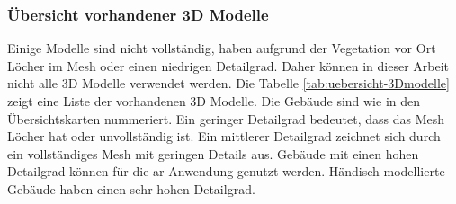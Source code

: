 \subsubsection{Übersicht vorhandener 3D Modelle}
Einige Modelle sind nicht vollständig, haben aufgrund der Vegetation vor Ort Löcher im Mesh oder einen niedrigen Detailgrad. Daher können in dieser Arbeit nicht alle 3D Modelle verwendet werden. Die Tabelle \ref{tab:uebersicht-3Dmodelle} zeigt eine Liste der vorhandenen 3D Modelle. Die Gebäude sind wie in den Übersichtskarten nummeriert. Ein geringer Detailgrad bedeutet, dass das Mesh Löcher hat oder unvollständig ist. Ein mittlerer Detailgrad zeichnet sich durch ein vollständiges Mesh mit geringen Details aus. Gebäude mit einen hohen Detailgrad können für die \Gls{ar} Anwendung genutzt werden. Händisch modellierte Gebäude haben einen sehr hohen Detailgrad.
